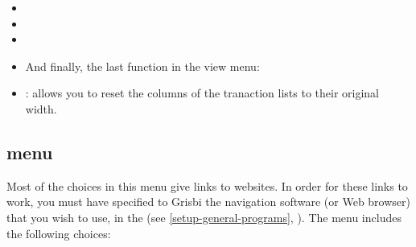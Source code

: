 \begin{itemize}
	\item {}%
	\item {}%
	\item {}%
	\item {}%
	\vspace{2mm}
	\begin{addmargin*}[0pt]{-.35cm} 	%
	And finally, the last function in the view menu:%
	\end{addmargin*}	
	\item {}: allows you to reset the columns of the tranaction lists to their original width. 
\end{itemize}


\subsection{ menu\label{home-menus-help}}

Most of the choices in this menu give links to websites. In order for these links to work, you must have specified to Grisbi the navigation software (or Web browser) that you wish to use, in the  (see \vref{setup-general-programs}, ). The  menu includes the following choices:

